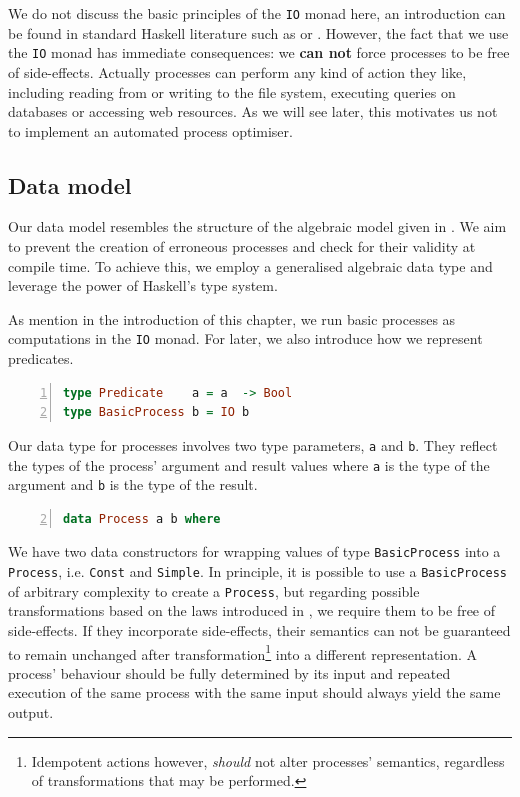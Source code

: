 We do not discuss the basic principles of the \texttt{IO} monad here, an introduction can be found in standard \textsf{Haskell} literature such as \cite{Hutton} or \cite{Bird}. However, the fact that we use the \texttt{IO} monad has immediate consequences: we \textbf{can not} force processes to be free of side-effects. Actually processes can perform any kind of action they like, including reading from or writing to the file system, executing queries on databases or accessing web resources. As we will see later, this motivates us not to implement an automated process optimiser.

\subsection{Data model}
\label{chp:local_model}
Our data model resembles the structure of the algebraic model given in . We aim to prevent the creation of erroneous processes and check for their validity at compile time. To achieve this, we employ a generalised algebraic data type and leverage the power of \textsf{Haskell}'s type system. 

As mention in the introduction of this chapter, we run basic processes as computations in the \texttt{IO} monad. For later, we also introduce how we represent predicates.
\begin{lstlisting}[language=Haskell,caption=Representation of basic processes as computations in the \texttt{IO} monad.,label=fig:local_computation,numbers=left,frame=bt]
type Predicate    a = a	 -> Bool
type BasicProcess b = IO b
\end{lstlisting}

Our data type for processes involves two type parameters, \texttt{a} and \texttt{b}. They reflect the types of the process' argument and result values where \texttt{a} is the type of the argument and \texttt{b} is the type of the result.
\begin{lstlisting}[language=Haskell,caption=Data type for the representation of processes.,label=fig:local_datatypes,numbers=left,frame=bt,firstnumber=2]
data Process a b where
\end{lstlisting}

We have two data constructors for wrapping values of type \texttt{BasicProcess} into a \texttt{Process}, i.e. \texttt{Const} and \texttt{Simple}. In principle, it is possible to use a \texttt{BasicProcess} of arbitrary complexity to create a \texttt{Process}, but regarding possible transformations based on the laws introduced in , we require them to be free of side-effects. If they incorporate side-effects, their semantics can not be guaranteed to remain unchanged after transformation\footnote{Idempotent actions however, \textit{should} not alter processes' semantics, regardless of transformations that may be performed.} into a different representation. A process' behaviour should be fully determined by its input and repeated execution of the same process with the same input should always yield the same output.

